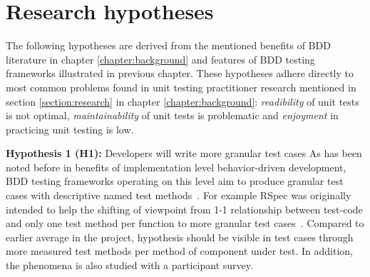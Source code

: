 \section{Research hypotheses}
    The following hypotheses are derived from the mentioned benefits of BDD literature in chapter \ref{chapter:background} and features of BDD
    testing frameworks illustrated in previous chapter. These hypotheses adhere directly to most common problems found in unit
    testing practitioner research mentioned in section \ref{section:research} in chapter \ref{chapter:background}:
    \textit{readibility} of unit tests is not optimal, \textit{maintainability} of unit tests is problematic and \textit{enjoyment}
    in practicing unit testing is low.
    \begin{addmargin}[0em]{0em}
    \vspace{10px}
    \textbf{Hypothesis 1 (H1):} Developers will write more granular test cases
    \vspace{5px}
    \newline
    As has been noted before in benefits of implementation level behavior-driven development, BDD testing frameworks operating on this
    level aim to produce granular test cases with descriptive named test methods~\cite{chelimsky2010rspec, astels2006new, kapelonis2016java}.
    For example RSpec was originally intended to help the shifting of viewpoint from 1-1 relationship between test-code
    and only one test method per function to more granular test cases~\cite{astels2006new}.
    Compared to earlier average in the project, hypothesis should be visible in test cases through more measured test methods
    per method of component under test. In addition, the phenomena is also studied with a participant survey.
    \end{addmargin}

